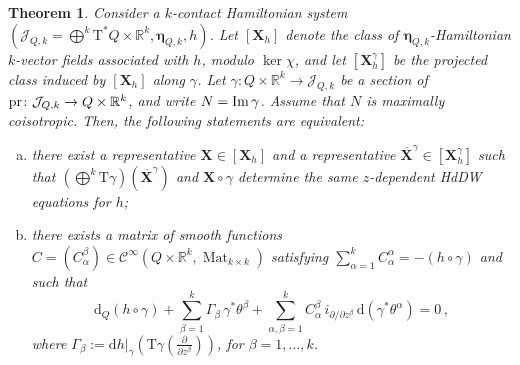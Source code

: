 \documentclass[11pt,twoside]{article}
\theoremstyle{plain}
\newtheorem{theorem}{Theorem}[section]
\theoremstyle{definition}
\theoremstyle{remark}
\newcommand{\dd}{\mathrm{d}}
\newcommand{\Cinfty}{\mathscr{C}^\infty}
\newcommand{\T}{\mathrm{T}}
\begin{document}
    \begin{theorem}\label{thm:zdependentHJ-gauge} Consider a \(k\)-contact Hamiltonian system \((\mathcal{J}_{Q,k}=\bigoplus^{k}\T^{*}Q\times\mathbb{R}^{k},\bm \eta_{{Q,k}},h)\). Let \([\mathbf X_h]\) denote the class of \(\bm\eta_{Q,k}\)-Hamiltonian \(k\)-vector fields associated with \(h\), modulo \(\ker\chi\), and let \([\mathbf X_h^\gamma]\) be the projected class induced by \([\mathbf X_h]\) along \(\gamma\). Let \(\gamma\colon Q\times\mathbb{R}^{k}\to \mathcal{J}_{Q,k}\) be a section of \({\rm pr}\colon\mathcal{J}_{Q,k}\to Q\times \mathbb{R}^k\), and write \(N={\rm Im}\,\gamma\). Assume that \(N\) is maximally coisotropic. Then, the following statements are equivalent:
\begin{enumerate}[(a)]
    \item there exist a representative \(\mathbf X\in[\mathbf X_h]\) and a representative \(\overline{\mathbf X}^{\gamma}\in[\mathbf X_h^\gamma]\) such that \((\bigoplus^k\T\gamma)(\overline{\mathbf X}^{\gamma})\) and \(\mathbf X\circ\gamma\) determine the same \(z\)-dependent HdDW equations for \(h\);
    \item there exists a matrix of smooth functions \(C=(C_\alpha^\beta)\in \Cinfty(Q\times\mathbb R^k,\operatorname{Mat}_{k\times k})\) satisfying \(\sum_{\alpha=1}^k C_\alpha^\alpha=-(h\circ\gamma)\) and such that
    \begin{equation}\label{eq:kContactHJGauge}
    \dd_Q(h\circ\gamma)+\sum_{\beta=1}^k \Gamma_\beta\,\gamma^*\theta^\beta+\sum_{\alpha,\beta=1}^k C_\alpha^\beta\,i_{\partial/\partial z^\beta}\,\dd(\gamma^*\theta^\alpha)=0\,,
    \end{equation} 
    where $\Gamma_\beta:=\dd h|_\gamma\!\left(\T\gamma\!\left(\frac{\partial}{\partial z^\beta}\right)\right)$, for $\beta=1,\dots,k$.
\end{enumerate}
\end{theorem}
\end{document}
